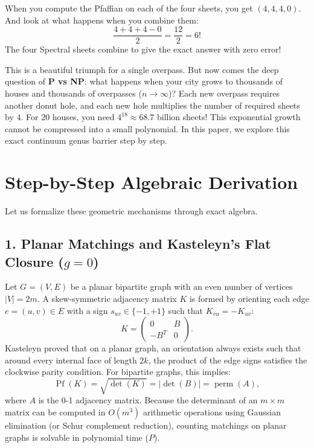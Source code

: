 \documentclass[11pt,a4paper]{article}
\theoremstyle{definition}
\begin{document}
When you compute the Pfaffian on each of the four sheets, you get $(4, 4, 4, 0)$. And look at what happens when you combine them:
\begin{equation}
\frac{4 + 4 + 4 - 0}{2} = \frac{12}{2} = 6!
\end{equation}
The four Spectral sheets combine to give the exact answer with zero error!

This is a beautiful triumph for a single overpass. But now comes the deep question of \textbf{P vs NP}: what happens when your city grows to thousands of houses and thousands of overpasses ($n \to \infty$)? Each new overpass requires another donut hole, and each new hole multiplies the number of required sheets by $4$. For $20$ houses, you need $4^{18} \approx 68.7$ billion sheets! This exponential growth cannot be compressed into a small polynomial. In this paper, we explore this exact continuum genus barrier step by step.


\section{Step-by-Step Algebraic Derivation}

Let us formalize these geometric mechanisms through exact algebra.

\subsection{1. Planar Matchings and Kasteleyn's Flat Closure ($g = 0$)}
Let $G = (V, E)$ be a planar bipartite graph with an even number of vertices $|V| = 2m$. A skew-symmetric adjacency matrix $K$ is formed by orienting each edge $e = (u, v) \in E$ with a sign $s_{uv} \in \{-1, +1\}$ such that $K_{vu} = -K_{uv}$:
\begin{equation}
K = \begin{pmatrix} 0 & B \\ -B^T & 0 \end{pmatrix}.
\end{equation}
Kasteleyn proved that on a planar graph, an orientation always exists such that around every internal face of length $2k$, the product of the edge signs satisfies the clockwise parity condition. For bipartite graphs, this implies:
\begin{equation}
\operatorname{Pf}(K) = \sqrt{\det(K)} = |\det(B)| = \operatorname{perm}(A),
\end{equation}
where $A$ is the 0-1 adjacency matrix. Because the determinant of an $m \times m$ matrix can be computed in $O(m^3)$ arithmetic operations using Gaussian elimination (or Schur complement reduction), counting matchings on planar graphs is solvable in polynomial time ($P$).
\end{document}
